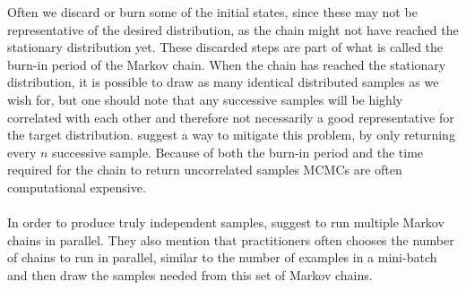 Often we discard or burn some of the initial states, since these may not be representative of the desired distribution, as the chain might not have reached the stationary distribution yet. These discarded steps are part of what is called the  burn-in period of the Markov chain. When the chain has reached the stationary distribution, it is possible to draw as many identical distributed samples as we wish for, but one should note that any successive samples will be highly correlated with each other and therefore not necessarily a good representative for the target distribution. \cite{Goodfellow-et-al-2016} suggest a way to mitigate this problem, by only returning every $n$ successive sample. Because of both the burn-in period and the time required for the chain to return uncorrelated samples MCMCs are often computational expensive. \\
\\
In order to produce truly independent samples, \cite{Goodfellow-et-al-2016} suggest to run multiple Markov chains in parallel. They also mention that practitioners often chooses the number of chains to run in parallel, similar to the number of examples in a mini-batch and then draw the samples needed from this set of Markov chains. 


